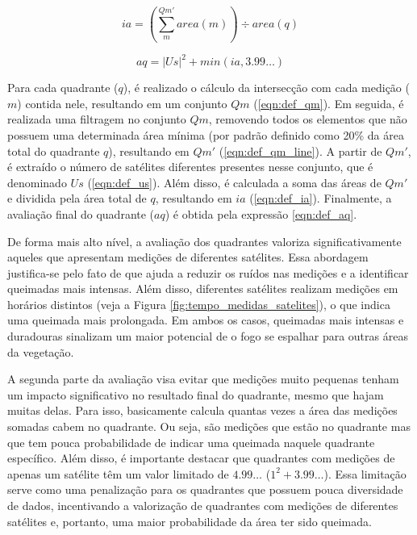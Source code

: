 \documentclass[cic,tc]{iiufrgs}
\begin{document}
\begin{equation} \label{eqn:def_ia}
ia = \left(\sum_{m}^{Qm'} area\left(m\right)\right) \div area(q)
\end{equation}

\begin{equation} \label{eqn:def_aq}
aq = |Us|^2 + min\left(ia, 3.99\ldots \right)
\end{equation}

Para cada quadrante ($q$), é realizado o cálculo da intersecção com cada medição ($m$) contida nele, resultando em um conjunto $Qm$ (\ref{eqn:def_qm}). Em seguida, é realizada uma filtragem no conjunto $Qm$, removendo todos os elementos que não possuem uma determinada área mínima (por padrão definido como 20\% da área total do quadrante $q$), resultando em $Qm'$ (\ref{eqn:def_qm_line}). A partir de $Qm'$, é extraído o número de satélites diferentes presentes nesse conjunto, que é denominado $Us$ (\ref{eqn:def_us}). Além disso, é calculada a soma das áreas de $Qm'$ e dividida pela área total de $q$, resultando em $ia$ (\ref{eqn:def_ia}). Finalmente, a avaliação final do quadrante ($aq$) é obtida pela expressão \ref{eqn:def_aq}. \par

De forma mais alto nível, a avaliação dos quadrantes valoriza significativamente aqueles que apresentam medições de diferentes satélites. Essa abordagem justifica-se pelo fato de que ajuda a reduzir os ruídos nas medições e a identificar queimadas mais intensas. Além disso, diferentes satélites realizam medições em horários distintos (veja a Figura \ref{fig:tempo_medidas_satelites}), o que indica uma queimada mais prolongada. Em ambos os casos, queimadas mais intensas e duradouras sinalizam um maior potencial de o fogo se espalhar para outras áreas da vegetação. \par

A segunda parte da avaliação visa evitar que medições muito pequenas tenham um impacto significativo no resultado final do quadrante, mesmo que hajam muitas delas. 
Para isso, basicamente calcula quantas vezes a área das medições somadas cabem no quadrante. Ou seja, são medições que estão no quadrante mas que tem pouca probabilidade de indicar uma queimada naquele quadrante específico. Além disso, é importante destacar que quadrantes com medições de apenas um satélite têm um valor limitado de $4.99\ldots$ ($1^2 + 3.99\ldots$). Essa limitação serve como uma penalização para os quadrantes que possuem pouca diversidade de dados, incentivando a valorização de quadrantes com medições de diferentes satélites e, portanto, uma maior probabilidade da área ter sido queimada. \par
\end{document}
